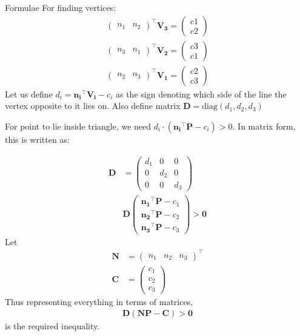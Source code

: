 \documentclass{beamer}
\providecommand{\brak}[1]{\ensuremath{\left(#1\right)}}
\theoremstyle{remark}
\newcommand{\myvec}[1]{\ensuremath{\begin{pmatrix}#1\end{pmatrix}}}
\let\vec\mathbf
\numberwithin{equation}{section}
\begin{document}
\begin{frame}{Formulae}
For finding vertices:
\begin{align}
 \myvec{n_1 & n_2}^\top\vec{V_3} = \myvec{c1 \\ c2} \\
 \myvec{n_3 & n_1}^\top\vec{V_2} = \myvec{c3 \\ c1} \\
 \myvec{n_2 & n_3}^\top\vec{V_1} = \myvec{c2 \\ c3}
\end{align}
Let us define $d_i = \vec{n_i}^\top\vec{V_i}-c_i$ as the sign denoting which side of the line the vertex opposite to it lies on. Also define matrix $\vec{D} = \text{diag}\brak{d_1,d_2,d_3}$ \par\noindent
For point to lie inside triangle, we need $d_i\cdot\brak{\vec{n_i}^\top\vec{P}-c_i} > 0$. In matrix form, this is written as:
\end{frame}
\begin{frame}
\begin{align}
\vec{D} &= \myvec{d_1 & 0 & 0 \\ 0 & d_2 & 0 \\ 0 & 0 & d_3} \\
  &\vec{D}\myvec{\vec{n_1}^\top\vec{P}-c_1 \\ \vec{n_2}^\top\vec{P}-c_2 \\ \vec{n_3}^\top\vec{P}-c_3} > \vec{0}
\end{align}
Let
\begin{align}
 \vec{N} &= \myvec{n_1 & n_2 & n_3}^\top \\
 \vec{C} &= \myvec{c_1 \\ c_2 \\ c_3}
\end{align}
Thus representing everything in terms of matrices,
\begin{align}
 \vec{D}\brak{\vec{N}\vec{P}-\vec{C}} > \vec{0}
\end{align}
is the required inequality.
\end{frame}
\end{document}
